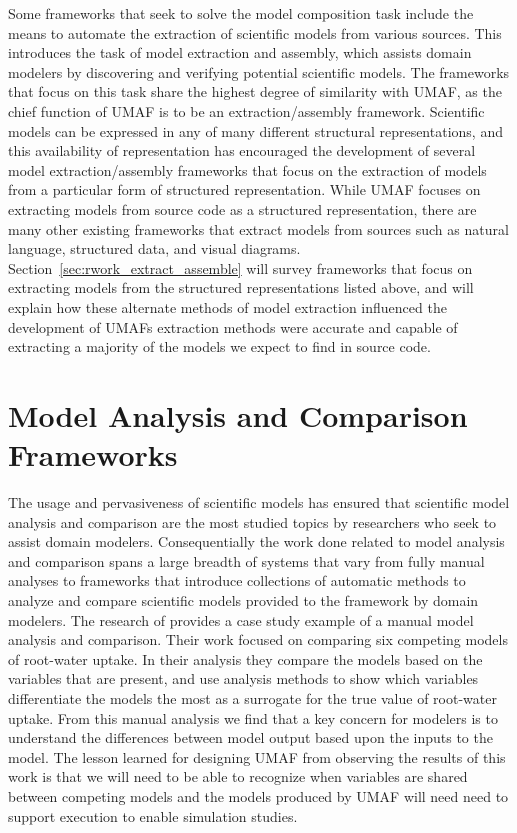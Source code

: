 Some frameworks that seek to solve the model composition task include the means to automate the extraction of scientific models from various sources.
This introduces the task of model extraction and assembly, which assists domain modelers by discovering and verifying potential scientific models.
The frameworks that focus on this task share the highest degree of similarity with UMAF, as the chief function of UMAF is to be an extraction/assembly framework.
Scientific models can be expressed in any of many different structural representations, and this availability of representation has encouraged the development of several model extraction/assembly frameworks that focus on the extraction of models from a particular form of structured representation.
While UMAF focuses on extracting models from source code as a structured representation, there are many other existing frameworks that extract models from sources such as natural language, structured data, and visual diagrams.
Section~\ref{sec:rwork_extract_assemble} will survey frameworks that focus on extracting models from the structured representations listed above, and will explain how these alternate methods of model extraction influenced the development of UMAFs extraction methods were accurate and capable of extracting a majority of the models we expect to find in source code.


\section{Model Analysis and Comparison Frameworks \label{sec:rwork_analysis_compare}}
The usage and pervasiveness of scientific models has ensured that scientific model analysis and comparison are the most studied topics by researchers who seek to assist domain modelers.
Consequentially the work done related to model analysis and comparison spans a large breadth of systems that vary from fully manual analyses to frameworks that introduce collections of automatic methods to analyze and compare scientific models provided to the framework by domain modelers.
The research of \citet{camargo2016six} provides a case study example of a manual model analysis and comparison.
Their work focused on comparing six competing models of root-water uptake.
In their analysis they compare the models based on the variables that are present, and use analysis methods to show which variables differentiate the models the most as a surrogate for the true value of root-water uptake.
From this manual analysis we find that a key concern for modelers is to understand the differences between model output based upon the inputs to the model.
The lesson learned for designing UMAF from observing the results of this work is that we will need to be able to recognize when variables are shared between competing models and the models produced by UMAF will need need to support execution to enable simulation studies.

